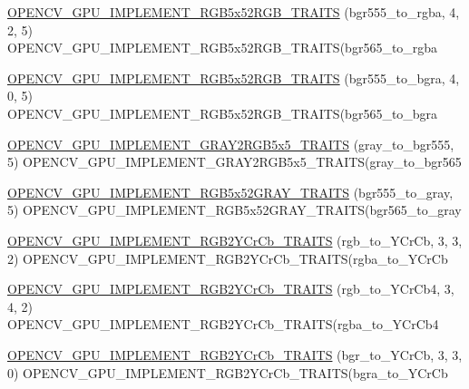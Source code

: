 \begin{DoxyCompactItemize}
\item 
\hyperlink{namespacecv_1_1gpu_1_1device_ad36ec83d5cb078f7f18f16ce35f44c7e}{O\-P\-E\-N\-C\-V\-\_\-\-G\-P\-U\-\_\-\-I\-M\-P\-L\-E\-M\-E\-N\-T\-\_\-\-R\-G\-B5x52\-R\-G\-B\-\_\-\-T\-R\-A\-I\-T\-S} (bgr555\-\_\-to\-\_\-rgba, 4, 2, 5) O\-P\-E\-N\-C\-V\-\_\-\-G\-P\-U\-\_\-\-I\-M\-P\-L\-E\-M\-E\-N\-T\-\_\-\-R\-G\-B5x52\-R\-G\-B\-\_\-\-T\-R\-A\-I\-T\-S(bgr565\-\_\-to\-\_\-rgba
\item 
\hyperlink{namespacecv_1_1gpu_1_1device_a86112ca2a2d3b7c85c6fbd7351729964}{O\-P\-E\-N\-C\-V\-\_\-\-G\-P\-U\-\_\-\-I\-M\-P\-L\-E\-M\-E\-N\-T\-\_\-\-R\-G\-B5x52\-R\-G\-B\-\_\-\-T\-R\-A\-I\-T\-S} (bgr555\-\_\-to\-\_\-bgra, 4, 0, 5) O\-P\-E\-N\-C\-V\-\_\-\-G\-P\-U\-\_\-\-I\-M\-P\-L\-E\-M\-E\-N\-T\-\_\-\-R\-G\-B5x52\-R\-G\-B\-\_\-\-T\-R\-A\-I\-T\-S(bgr565\-\_\-to\-\_\-bgra
\item 
\hyperlink{namespacecv_1_1gpu_1_1device_ae802a1e48c4a6f74ac7758cfceab0ddc}{O\-P\-E\-N\-C\-V\-\_\-\-G\-P\-U\-\_\-\-I\-M\-P\-L\-E\-M\-E\-N\-T\-\_\-\-G\-R\-A\-Y2\-R\-G\-B5x5\-\_\-\-T\-R\-A\-I\-T\-S} (gray\-\_\-to\-\_\-bgr555, 5) O\-P\-E\-N\-C\-V\-\_\-\-G\-P\-U\-\_\-\-I\-M\-P\-L\-E\-M\-E\-N\-T\-\_\-\-G\-R\-A\-Y2\-R\-G\-B5x5\-\_\-\-T\-R\-A\-I\-T\-S(gray\-\_\-to\-\_\-bgr565
\item 
\hyperlink{namespacecv_1_1gpu_1_1device_a155f67a3ee39dea03e9373124667205d}{O\-P\-E\-N\-C\-V\-\_\-\-G\-P\-U\-\_\-\-I\-M\-P\-L\-E\-M\-E\-N\-T\-\_\-\-R\-G\-B5x52\-G\-R\-A\-Y\-\_\-\-T\-R\-A\-I\-T\-S} (bgr555\-\_\-to\-\_\-gray, 5) O\-P\-E\-N\-C\-V\-\_\-\-G\-P\-U\-\_\-\-I\-M\-P\-L\-E\-M\-E\-N\-T\-\_\-\-R\-G\-B5x52\-G\-R\-A\-Y\-\_\-\-T\-R\-A\-I\-T\-S(bgr565\-\_\-to\-\_\-gray
\item 
\hyperlink{namespacecv_1_1gpu_1_1device_a0360ba7334a14d9bb78c6997d35ddcc7}{O\-P\-E\-N\-C\-V\-\_\-\-G\-P\-U\-\_\-\-I\-M\-P\-L\-E\-M\-E\-N\-T\-\_\-\-R\-G\-B2\-Y\-Cr\-Cb\-\_\-\-T\-R\-A\-I\-T\-S} (rgb\-\_\-to\-\_\-\-Y\-Cr\-Cb, 3, 3, 2) O\-P\-E\-N\-C\-V\-\_\-\-G\-P\-U\-\_\-\-I\-M\-P\-L\-E\-M\-E\-N\-T\-\_\-\-R\-G\-B2\-Y\-Cr\-Cb\-\_\-\-T\-R\-A\-I\-T\-S(rgba\-\_\-to\-\_\-\-Y\-Cr\-Cb
\item 
\hyperlink{namespacecv_1_1gpu_1_1device_a0520b6ef065566b9be16381f62ff0f0d}{O\-P\-E\-N\-C\-V\-\_\-\-G\-P\-U\-\_\-\-I\-M\-P\-L\-E\-M\-E\-N\-T\-\_\-\-R\-G\-B2\-Y\-Cr\-Cb\-\_\-\-T\-R\-A\-I\-T\-S} (rgb\-\_\-to\-\_\-\-Y\-Cr\-Cb4, 3, 4, 2) O\-P\-E\-N\-C\-V\-\_\-\-G\-P\-U\-\_\-\-I\-M\-P\-L\-E\-M\-E\-N\-T\-\_\-\-R\-G\-B2\-Y\-Cr\-Cb\-\_\-\-T\-R\-A\-I\-T\-S(rgba\-\_\-to\-\_\-\-Y\-Cr\-Cb4
\item 
\hyperlink{namespacecv_1_1gpu_1_1device_ae1fad8386fed237b8941859462ce3006}{O\-P\-E\-N\-C\-V\-\_\-\-G\-P\-U\-\_\-\-I\-M\-P\-L\-E\-M\-E\-N\-T\-\_\-\-R\-G\-B2\-Y\-Cr\-Cb\-\_\-\-T\-R\-A\-I\-T\-S} (bgr\-\_\-to\-\_\-\-Y\-Cr\-Cb, 3, 3, 0) O\-P\-E\-N\-C\-V\-\_\-\-G\-P\-U\-\_\-\-I\-M\-P\-L\-E\-M\-E\-N\-T\-\_\-\-R\-G\-B2\-Y\-Cr\-Cb\-\_\-\-T\-R\-A\-I\-T\-S(bgra\-\_\-to\-\_\-\-Y\-Cr\-Cb

\end{DoxyCompactItemize}
